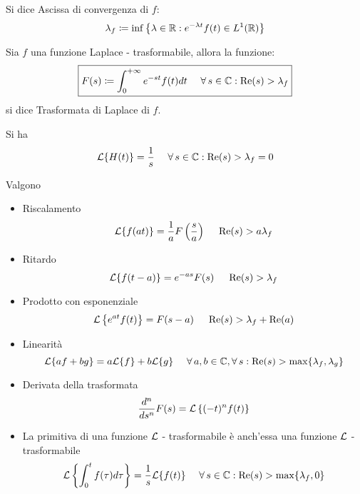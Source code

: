 \begin{defn}
Si dice Ascissa di convergenza di $\displaystyle f$:
\begin{equation*}
\lambda_{f} \coloneqq \inf\left\{\lambda \in \mathbb{R} :e^{- \lambda t} f(t) \in L^{1}(\mathbb{R})\right\}
\end{equation*}
\end{defn}
\begin{defn}
Sia $\displaystyle f$ una funzione Laplace - trasformabile, allora la funzione:
\begin{equation*}
\boxed{F(s) \coloneqq \int^{+ \infty}_{0} e^{- st} f(t) dt\ \ \ \ \forall s\in \CC :\Re (s) > \lambda_{f}}
\end{equation*}
si dice Trasformata di Laplace di $\displaystyle f$.
\end{defn}
\begin{rem}
 Si ha
\begin{equation*}
\Lc\{H(t)\} = \frac{1}{s} \ \ \ \ \forall s\in \CC :\Re (s) > \lambda_{f} = 0
\end{equation*}
\end{rem}
\begin{thm}
[Proprietà] Valgono
\begin{itemize}
\item Riscalamento
\begin{equation*}
\mathcal{L}\{f(at)\} = \frac{1}{a} F\left(\frac{s}{a}\right) \ \ \ \ \operatorname{Re} (s) > a\lambda_{f}
\end{equation*}
\item Ritardo
\begin{equation*}
\mathcal{L}\{f(t - a)\} = e^{- as} F(s) \ \ \ \ \operatorname{Re} (s) > \lambda_{f}
\end{equation*}
\item Prodotto con esponenziale
\begin{equation*}
\Lc\left\{e^{at} f(t)\right\} = F(s - a) \ \ \ \ \Re (s) > \lambda_{f} + \Re (a)
\end{equation*}
\item Linearità
\begin{equation*}
\Lc\{af + bg\} = a\Lc\{f\} + b\Lc\{g\} \ \ \ \ \forall a, b\in \CC, \forall s:\Re (s) > \max\{\lambda_{f}, \lambda_{g}\}
\end{equation*}
\item Derivata della trasformata
\begin{equation*}
\frac{d^{n}}{ds^{n}} F(s) = \mathcal{L}\left\{(- t)^{n} f(t)\right\}
\end{equation*}
\item La primitiva di una funzione $\mathcal{L}$ - trasformabile è anch'essa una funzione $\mathcal{L}$ - trasformabile
\begin{equation*}
\Lc\left\{\int^{t}_{0} f(\tau) d\tau \right\} = \frac{1}{s}\Lc\{f(t)\} \ \ \ \ \forall s\in \CC :\Re (s) > \max\{\lambda_{f}, 0\}
\end{equation*}
\end{itemize}
\end{thm}
